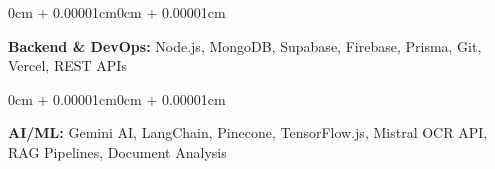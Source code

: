 \documentclass[10pt, letterpaper]{article}
\newenvironment{onecolentry}{
    \begin{adjustwidth}{0cm + 0.00001cm}{0cm + 0.00001cm}
}{
    \end{adjustwidth}
}
\begin{document}
        \vspace{0.06cm}
        \begin{onecolentry}
            \textbf{Backend \& DevOps:} Node.js, MongoDB, Supabase, Firebase, \textcolor{primaryColor}{Prisma}, Git, Vercel, REST APIs
        \end{onecolentry}
        
        \vspace{0.06cm}
        \begin{onecolentry}
            \textbf{AI/ML:} \textcolor{primaryColor}{Gemini AI}, LangChain, Pinecone, TensorFlow.js, \textcolor{primaryColor}{Mistral OCR API}, RAG Pipelines, Document Analysis
        \end{onecolentry}
\end{document}
